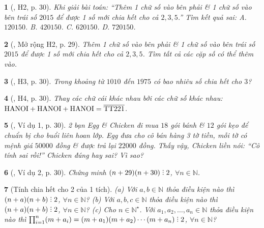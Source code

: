 \documentclass{article}
\newtheorem{baitoan}{}
\DeclareRobustCommand{\divby}{%
	\mathrel{\vbox{\baselineskip.65ex\lineskiplimit0pt\hbox{.}\hbox{.}\hbox{.}}}%
}
\begin{document}
\begin{baitoan}[\cite{Binh_boi_duong_Toan_6_tap_1}, H2, p. 30]
	Khi giải bài toán: ``Thêm 1 chữ số vào bên phải \& 1 chữ số vào bên trái số $2015$ để được 1 số mới chia hết cho cả $2,3,5$.'' Tìm kết quả sai: {\sf A.} $120150$. {\sf B.} $420150$. {\sf C.} $620150$. {\sf D.} $720150$.
\end{baitoan}

\begin{baitoan}[\cite{Binh_boi_duong_Toan_6_tap_1}, Mở rộng H2, p. 29]
	Thêm 1 chữ số vào bên phải \& 1 chữ số vào bên trái số $2015$ để được 1 số mới chia hết cho cả $2,3,5$. Tìm tất cả các cặp số có thể thêm vào.
\end{baitoan}

\begin{baitoan}[\cite{Binh_boi_duong_Toan_6_tap_1}, H3, p. 30]
	Trong khoảng từ $1010$ đến $1975$ có bao nhiêu số chia hết cho $3$?
\end{baitoan}

\begin{baitoan}[\cite{Binh_boi_duong_Toan_6_tap_1}, H4, p. 30]
	Thay các chữ cái khác nhau bởi các chữ số khác nhau: $\rm HANOI + HANOI + HANOI = \overline{TT221}$.
\end{baitoan}

\begin{baitoan}[\cite{Binh_boi_duong_Toan_6_tap_1}, Ví dụ 1, p. 30]
	2 bạn Egg \& Chicken đi mua $18$ gói bánh \& $12$ gói kẹo để chuẩn bị cho buổi liên hoan lớp. Egg đưa cho cô bán hàng 3 tờ tiền, mỗi tờ có mệnh giá $50000$ đồng \& được trả lại $22000$ đồng. Thấy vậy, Chicken liền nói: ``Cô tính sai rồi!'' Chicken đúng hay sai? Vì sao?
\end{baitoan}

\begin{baitoan}[\cite{Binh_boi_duong_Toan_6_tap_1}, Ví dụ 2, p. 30]
	Chứng minh $(n + 29)(n + 30)\divby2$, $\forall n\in\mathbb{N}$.
\end{baitoan}

\begin{baitoan}[Tính chia hết cho 2 của 1 tích]
	(a) Với $a,b\in\mathbb{N}$ thỏa điều kiện nào thì $(n + a)(n + b)\divby2$, $\forall n\in\mathbb{N}$? (b) Với $a,b,c\in\mathbb{N}$ thỏa điều kiện nào thì $(n + a)(n + b)\divby2$, $\forall n\in\mathbb{N}$? (c) Cho $n\in\mathbb{N}^\star$. Với $a_1,a_2,\ldots,a_n\in\mathbb{N}$ thỏa điều kiện nào thì $\prod_{i=1}^n (m + a_i) = (m + a_1)(m + a_2)\cdots(m + a_n)\divby2$, $\forall n\in\mathbb{N}$?
\end{baitoan}
\end{document}
